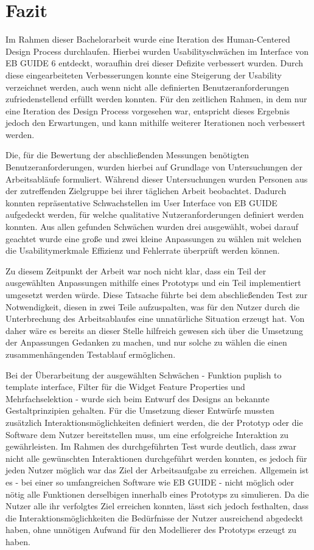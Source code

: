 \chapter{Fazit}\label{ch:summary}

Im Rahmen dieser Bachelorarbeit wurde eine Iteration des Human-Centered Design Process durchlaufen.
Hierbei wurden Usabilityschwächen im Interface von EB GUIDE 6 entdeckt, woraufhin drei dieser Defizite verbessert wurden.
Durch diese eingearbeiteten Verbesserungen konnte eine Steigerung der Usability verzeichnet werden, auch wenn nicht alle definierten Benutzeranforderungen zufriedenstellend erfüllt werden konnten.
Für den zeitlichen Rahmen, in dem nur eine Iteration des Design Process vorgesehen war, entspricht dieses Ergebnis jedoch den Erwartungen, und kann mithilfe weiterer Iterationen noch verbessert werden.

Die, für die Bewertung der abschließenden Messungen benötigten Benutzeranforderungen, wurden hierbei auf Grundlage von Untersuchungen der Arbeitsabläufe formuliert.
Während dieser Untersuchungen wurden Personen aus der zutreffenden Zielgruppe bei ihrer täglichen Arbeit beobachtet.
Dadurch konnten repräsentative Schwachstellen im User Interface von EB GUIDE aufgedeckt werden, für welche qualitative Nutzeranforderungen definiert werden konnten.
Aus allen gefunden Schwächen wurden drei ausgewählt, wobei darauf geachtet wurde eine große und zwei kleine Anpassungen zu wählen mit welchen die Usabilitymerkmale Effizienz und Fehlerrate überprüft werden können.

Zu diesem Zeitpunkt der Arbeit war noch nicht klar, dass ein Teil der ausgewählten Anpassungen mithilfe eines Prototyps und ein Teil implementiert umgesetzt werden würde.
Diese Tatsache führte bei dem abschließenden Test zur Notwendigkeit, diesen in zwei Teile aufzuspalten, was für den Nutzer durch die Unterbrechung des Arbeitsablaufes eine unnatürliche Situation erzeugt hat.
Von daher wäre es bereits an dieser Stelle hilfreich gewesen sich über die Umsetzung der Anpassungen Gedanken zu machen, und nur solche zu wählen die einen zusammenhängenden Testablauf ermöglichen.

Bei der Überarbeitung der ausgewählten Schwächen - Funktion  \glqq puplish to template interface\grqq{}, Filter für die \glqq Widget Feature Properties\grqq{} und  \glqq Mehrfachselektion\grqq{} - wurde sich beim Entwurf des Designs an bekannte Gestaltprinzipien gehalten.
Für die Umsetzung dieser Entwürfe mussten zusätzlich Interaktionsmöglichkeiten definiert werden, die der Prototyp oder die Software dem Nutzer bereitstellen muss, um eine erfolgreiche Interaktion zu gewährleisten.
Im Rahmen des durchgeführten Test wurde deutlich, dass zwar nicht alle gewünschten Interaktionen durchgeführt werden konnten, es jedoch für jeden Nutzer möglich war das Ziel der Arbeitsaufgabe zu erreichen.
Allgemein ist es - bei einer so umfangreichen Software wie EB GUIDE - nicht möglich oder nötig alle Funktionen derselbigen innerhalb eines Prototyps zu simulieren.
Da die Nutzer alle ihr verfolgtes Ziel erreichen konnten, lässt sich jedoch festhalten, dass die Interaktionsmöglichkeiten die Bedürfnisse der Nutzer ausreichend abgedeckt haben, ohne unnötigen Aufwand für den Modellierer des Prototyps erzeugt zu haben.

